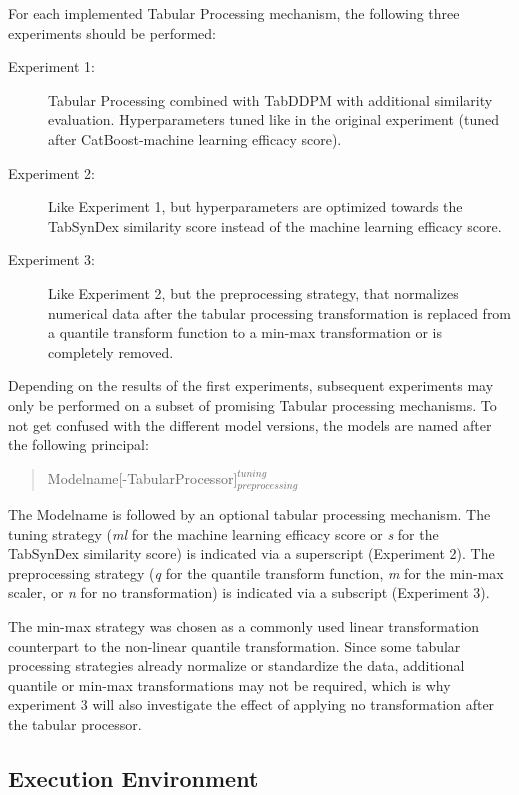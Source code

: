 \noindent For each implemented Tabular Processing mechanism, the following three experiments should be performed:

\begin{description}
	\item[Experiment 1:] Tabular Processing combined with TabDDPM with additional similarity evaluation. Hyperparameters tuned like in the original experiment (tuned after CatBoost-machine learning efficacy score).
	\item[Experiment 2:] Like Experiment 1, but hyperparameters are optimized towards the TabSynDex similarity score instead of the machine learning efficacy score.
	\item[Experiment 3:] Like Experiment 2, but the preprocessing strategy, that normalizes numerical data after the tabular processing transformation is replaced from a quantile transform function to a min-max transformation or is completely removed.
\end{description}

\noindent Depending on the results of the first experiments, subsequent experiments may only be performed on a subset of promising Tabular processing mechanisms.
To not get confused with the different \gls{model} versions, the models are named after the following principal:
\begin{quote}
Modelname[-TabularProcessor]$^{tuning}_{preprocessing}$
\end{quote}
The Modelname is followed by an optional tabular processing mechanism.
The tuning strategy (\textit{ml} for the machine learning efficacy score or \textit{s} for the TabSynDex similarity score) is indicated via a superscript (Experiment 2).
The preprocessing strategy (\textit{q} for the quantile transform function, \textit{m} for the min-max scaler, or \textit{n} for no transformation) is indicated via a subscript (Experiment 3).

The min-max strategy was chosen as a commonly used linear transformation counterpart to the non-linear quantile transformation.
Since some tabular processing strategies already normalize or standardize the data, additional quantile or min-max transformations may not be required, 
which is why experiment 3 will also investigate the effect of applying no transformation after the tabular processor.

\subsection{Execution Environment}
\label{ch:environment}

